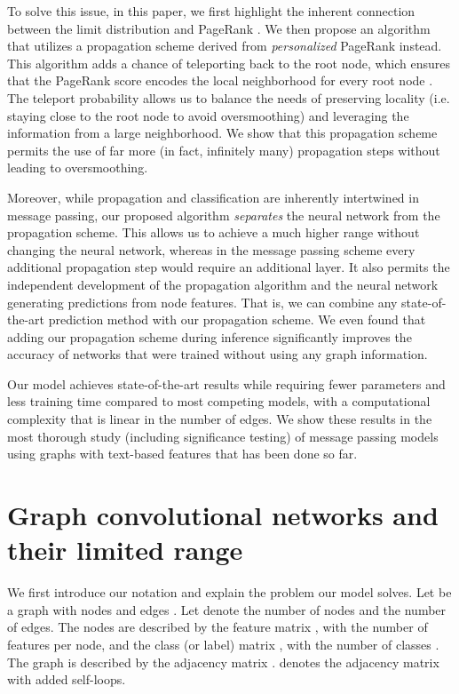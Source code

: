\documentclass{article} \usepackage{iclr2019_conference,times}
\begin{document}
To solve this issue, in this paper, we first highlight the inherent connection between the limit distribution and PageRank \citep{page_pagerank_1998}. We then propose an algorithm that utilizes a propagation scheme derived from \emph{personalized} PageRank instead. This algorithm adds a chance of teleporting back to the root node, which ensures that the PageRank score encodes the local neighborhood for every root node \citep{page_pagerank_1998}. The teleport probability allows us to balance the needs of preserving locality (i.e. staying close to the root node to avoid oversmoothing) and leveraging the information from a large neighborhood. We show that this propagation scheme permits the use of far more (in fact, infinitely many) propagation steps without leading to oversmoothing.

Moreover, while propagation and classification are inherently intertwined in message passing, our proposed algorithm \emph{separates} the neural network from the propagation scheme. This allows us to achieve a much higher range without changing the neural network, whereas in the message passing scheme every additional propagation step would require an additional layer. It also permits the independent development of the propagation algorithm and the neural network generating predictions from node features. That is, we can combine any state-of-the-art prediction method with our propagation scheme. We even found that adding our propagation scheme during inference significantly improves the accuracy of networks that were trained without using any graph information.

Our model achieves state-of-the-art results while requiring fewer parameters and less training time compared to most competing models, with a computational complexity that is linear in the number of edges. We show these results in the most thorough study (including significance testing) of message passing models using graphs with text-based features that has been done so far.

\section{Graph convolutional networks and their limited range} \label{sec:gcnrange}

We first introduce our notation and explain the problem our model solves. Let  be a graph with nodes  and edges . Let  denote the number of nodes and  the number of edges. The nodes are described by the feature matrix , with the number of features  per node, and the class (or label) matrix , with the number of classes . The graph  is described by the adjacency matrix .  denotes the adjacency matrix with added self-loops.
\end{document}
